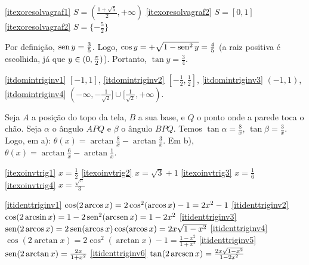\begin{Solution}{2.32}
\ref{itexoresolvagraf1} $S=(\frac{1+\sqrt{5}}{2},+\infty)$
\ref{itexoresolvagraf2} $S=[0,1]$
\ref{itexoresolvagraf2} $S=\{-\tfrac52\}$
\end{Solution}
\begin{Solution}{2.33}
Por definição, $\operatorname{sen} y=\tfrac35$. Logo, $\cos y=+\sqrt{1-\operatorname{sen}^2 y}=\tfrac45$ (a raiz
positiva é escolhida, já que $y\in (0,\tfrac{\pi}{2})$). Portanto, $\tan y=\tfrac34$.
\end{Solution}
\begin{Solution}{2.34}
\eqref{itdomintriginv1} $[-1,1]$,
\eqref{itdomintriginv2} $[-\tfrac12,\tfrac12]$,
\eqref{itdomintriginv3} $(-1,1)$,
\eqref{itdomintriginv4} $(-\infty,-\tfrac{1}{\sqrt{2}}]\cup
[\tfrac{1}{\sqrt{2}},+\infty)$.
\end{Solution}
\begin{Solution}{2.35}
Seja $A$ a posição do topo da tela, $B$ a sua base, e $Q$ o ponto onde a parede toca o chão.
Seja $\alpha$ o ângulo $APQ$ e $\beta$ o ângulo $BPQ$.
Temos $\tan \alpha=\tfrac8x$, $\tan \beta=\tfrac3x$. Logo, em a):
$\theta(x)=\arctan\tfrac8x-\arctan\tfrac3x$. Em
b), $\theta(x)=\arctan\tfrac6x-\arctan\tfrac1x$.
\end{Solution}
\begin{Solution}{2.36}
\eqref{itexoinvtrig1} $x=\frac{1}{2}$
\eqref{itexoinvtrig2} $x=\sqrt{3}+1$
\eqref{itexoinvtrig3} $x=\tfrac16$
\eqref{itexoinvtrig4} $x=\tfrac{\sqrt{\pi}}{3}$
\end{Solution}
\begin{Solution}{2.37}
\eqref{itidenttriginv1} $\cos(2\operatorname{arcos} x)=2\cos^2(\operatorname{arcos} x)-1=2x^2-1$
\eqref{itidenttriginv2} $\cos(2\arcsin x)=1-2\operatorname{sen}^2(\operatorname{arcsen} x)=1-2x^2$
\eqref{itidenttriginv3} $\operatorname{sen}(2\operatorname{arcos} x)=2\operatorname{sen} (\operatorname{arcos} x)\cos (\operatorname{arcos} x)=2x\sqrt{1-x^2}$
\eqref{itidenttriginv4} $\cos(2\arctan x)=2\cos^2(\arctan x)-1=\tfrac{1-x^2}{1+x^2}$
\eqref{itidenttriginv5} $\operatorname{sen} (2\arctan x)=\frac{2x}{1+x^2}$
\eqref{itidenttriginv6} $\tan (2\operatorname{arcsen} x)=\frac{2x\sqrt{1-x^2}}{1-2x^2}$
\end{Solution}
